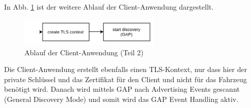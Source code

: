 \\\\
In Abb. \ref{fig: impl ablauf anwendung client teil 2} ist der weitere Ablauf der Client-Anwendung dargestellt.
\begin{figure}[H]
    \centering
    \includegraphics[width=0.6\textwidth]{graphics/ablauf_anwendung_teil_2_client.pdf}
    \caption[Ablauf der Client-Anwendung (Teil 2)]{Ablauf der Client-Anwendung (Teil 2)}
    \label{fig: impl ablauf anwendung client teil 2}
\end{figure}
Die Client-Anwendung erstellt ebenfalls einen TLS-Kontext, nur dass hier der private Schlüssel und das Zertifikat für den Client und nicht für das Fahrzeug benötigt wird. Danach wird mittels GAP nach Advertising Events gescannt (General Discovery Mode) und somit wird das GAP Event Handling aktiv.
\\\\

